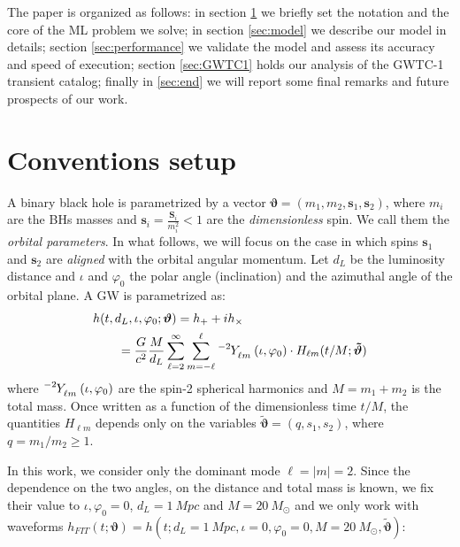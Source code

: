 The paper is organized as follows:
in section \ref{sec:setup} we briefly set the notation and the core of the ML problem we solve; in section \ref{sec:model} we describe our model in details; section \ref{sec:performance} we validate the model and assess its accuracy and speed of execution; section \ref{sec:GWTC1} holds our analysis of the GWTC-1 transient catalog; finally in \ref{sec:end} we will report some final remarks and future prospects of our work.

\section{Conventions setup}
\label{sec:setup}
A binary black hole is parametrized by a vector $ \boldsymbol{\vartheta} = (m_1,m_2, \mathbf{s}_1,\mathbf{s}_2) $, where $m_i$ are the BHs masses and $\mathbf{s}_i = \frac{\mathbf{S}_i}{m_i^2} <1$ are the \textit{dimensionless} spin.
We call them the \textit{orbital parameters}.
In what follows, we will focus on the case in which spins $\mathbf{s}_1$ and $\mathbf{s}_2$ are \textit{aligned} with the orbital angular momentum. 
Let $d_L$ be the luminosity distance and $\iota$ and $\varphi_0$ the polar angle (inclination) and the azimuthal angle of the orbital plane.
A GW is parametrized as:
\begin{align} \label{eq:h_parametrization}
	&h(t, d_L,\iota,\varphi_0; \boldsymbol{\vartheta}) = h_+ + i h_\times \nonumber \\
		&\qquad= \frac{G}{c^2} \frac{M}{d_L}\sum_{\ell = 2}^{\infty} \sum_{m = -\ell}^{\ell} \tensor[^{-2}]{Y}{_{\ell m}}(\iota, \varphi_0) \cdot H_{\ell m}(t/M; \boldsymbol{\tilde{\vartheta}})
\end{align}
where $\tensor[^{-2}]{Y}{_{\ell m}}(\iota, \varphi_0)$ are the spin-2 spherical harmonics and $M = m_1+m_2$ is the total mass.
Once written as a function of the dimensionless time $t/M$, the quantities $H_{\ell m}$ depends only on the variables $\tilde{\boldsymbol{\vartheta}} = (q, s_1, s_2)$, where $q= m_1/m_2 \geq 1$.
\par
In this work, we consider only the dominant mode $\ell=|m|=2$.
Since the dependence on the two angles, on the distance and total mass is known, we fix their value to ${\iota, \varphi_0 = 0}$, ${d_L = \SI{1}{Mpc}}$ and $M = \SI{20}{M_\odot}$ and we only work with waveforms ${h_{FIT}(t; \boldsymbol{\vartheta}) = h(t; d_L = \SI{1}{Mpc}, \iota = 0, \varphi_0 = 0, M = \SI{20}{M_\odot}, \boldsymbol{\tilde{\vartheta}}) }$:
